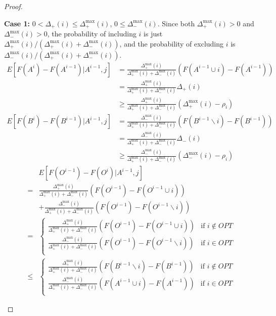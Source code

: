 \begin{proof}
\begin{description}
\item\textbf{Case 1:} $0 < \Delta_+(i) \leq \Delta_+^{\max}(i)$, $0 \leq \Delta_-^{\max}(i)$.
Since both $\Delta_+^{\max}(i)>0$ and $\Delta_-^{\max}(i)>0$, the probability of including $i$ is just $\Delta_+^{\max}(i) / (\Delta_+^{\max}(i) + \Delta_-^{\max}(i))$, and the probability of excluding $i$ is $\Delta_-^{\max}(i) / (\Delta_+^{\max}(i) + \Delta_-^{\max}(i))$.
\begin{align*}
E[F(A^i) - F(A^{i-1}) | A^{i-1}, j]
&= \frac{\Delta_+^{\max}(i)}{\Delta_+^{\max}(i) + \Delta_-^{\max}(i)} (F(A^{i-1}\cup i) - F(A^{i-1}))\\
&= \frac{\Delta_+^{\max}(i)}{\Delta_+^{\max}(i) + \Delta_-^{\max}(i)} \Delta_+(i)\\
&\geq \frac{\Delta_+^{\max}(i)}{\Delta_+^{\max}(i) + \Delta_-^{\max}(i)} (\Delta_+^{\max}(i) - \rho_i)\\
E[F(B^i) - F(B^{i-1}) | A^{i-1}, j]
&= \frac{\Delta_-^{\max}(i)}{\Delta_+^{\max}(i) + \Delta_-^{\max}(i)} (F(B^{i-1}\backslash i) - F(B^{i-1}))\\
&= \frac{\Delta_-^{\max}(i)}{\Delta_+^{\max}(i) + \Delta_-^{\max}(i)} \Delta_-(i)\\
&\geq \frac{\Delta_-^{\max}(i)}{\Delta_+^{\max}(i) + \Delta_-^{\max}(i)} (\Delta_-^{\max}(i) - \rho_i)
\end{align*}
\begin{align*}
&E[F(O^{i-1}) - F(O^i) | A^{i-1}, j]\\
=&   \frac{\Delta_+^{\max}(i)}{\Delta_+^{\max}(i) + \Delta_-^{\max}(i)} (F(O^{i-1}) - F(O^{i-1} \cup i)) \\
 & + \frac{\Delta_-^{\max}(i)}{\Delta_+^{\max}(i) + \Delta_-^{\max}(i)} (F(O^{i-1}) - F(O^{i-1} \backslash i)) \\
=&\begin{cases}
    \frac{\Delta_+^{\max}(i)}{\Delta_+^{\max}(i) + \Delta_-^{\max}(i)} (F(O^{i-1}) - F(O^{i-1} \cup i))       & \text{if $i\not\in OPT$}\\
    \frac{\Delta_-^{\max}(i)}{\Delta_+^{\max}(i) + \Delta_-^{\max}(i)} (F(O^{i-1}) - F(O^{i-1} \backslash i)) & \text{if $i    \in OPT$}\\
\end{cases}\\
\leq&\begin{cases}
    \frac{\Delta_+^{\max}(i)}{\Delta_+^{\max}(i) + \Delta_-^{\max}(i)} (F(B^{i-1}\backslash i) - F(B^{i-1})) & \text{if $i\not\in OPT$}\\
    \frac{\Delta_-^{\max}(i)}{\Delta_+^{\max}(i) + \Delta_-^{\max}(i)} (F(A^{i-1}\cup i) - F(A^{i-1}))       & \text{if $i    \in OPT$}\\

\end{cases}
\end{align*}
\end{description}
\end{proof}
